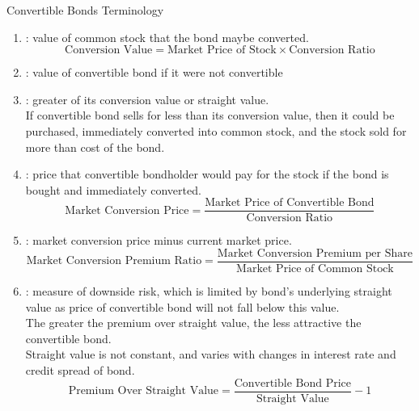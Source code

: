 \begin{remark} Convertible Bonds Terminology
\begin{enumerate}[label=\roman*.]
\setlength{\itemsep}{0pt}
\item {}: value of common stock that the bond maybe converted.
\begin{equation}
\text{Conversion Value} = \text{Market Price of Stock} \times \text{Conversion Ratio} \nonumber
\end{equation}
\item {}: value of convertible bond if it were not convertible
\item {}: greater of its conversion value or straight value.\\
If convertible bond sells for less than its conversion value, then it could be purchased, immediately converted into common stock, and the stock sold for more than cost of the bond.
\item {}: price that convertible bondholder would pay for the stock if the bond is bought and immediately converted.
\begin{equation}
\text{Market Conversion Price} = \frac{\text{Market Price of Convertible Bond}}{\text{Conversion Ratio}} \nonumber
\end{equation}
\item {}: market conversion price minus current market price.
\begin{equation}
\text{Market Conversion Premium Ratio} = \frac{\text{Market Conversion Premium per Share}}{\text{Market Price of Common Stock}} \nonumber
\end{equation}
\item {}: measure of downside risk, which is limited by bond's underlying straight value as price of convertible bond will not fall below this value.\\
The greater the premium over straight value, the less attractive the convertible bond.\\
Straight value is not constant, and varies with changes in interest rate and credit spread of bond.
\begin{equation}
\text{Premium Over Straight Value} = \frac{\text{Convertible Bond Price}}{\text{Straight Value}} - 1 \nonumber
\end{equation}
\end{enumerate}
\end{remark}

